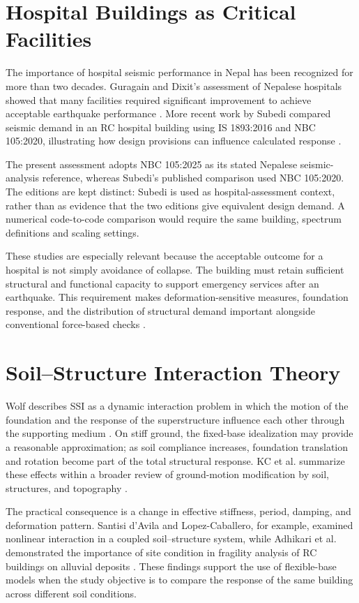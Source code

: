 \section{Hospital Buildings as Critical Facilities}
The importance of hospital seismic performance in Nepal has been recognized for more than two decades. Guragain and Dixit's assessment of Nepalese hospitals showed that many facilities required significant improvement to achieve acceptable earthquake performance \cite{guragain2004}. More recent work by Subedi compared seismic demand in an RC hospital building using IS 1893:2016 and NBC 105:2020, illustrating how design provisions can influence calculated response \cite{subedi2022}.

The present assessment adopts NBC 105:2025 as its stated Nepalese seismic-analysis reference, whereas Subedi's published comparison used NBC 105:2020. The editions are kept distinct: Subedi is used as hospital-assessment context, rather than as evidence that the two editions give equivalent design demand. A numerical code-to-code comparison would require the same building, spectrum definitions and scaling settings.

These studies are especially relevant because the acceptable outcome for a hospital is not simply avoidance of collapse. The building must retain sufficient structural and functional capacity to support emergency services after an earthquake. This requirement makes deformation-sensitive measures, foundation response, and the distribution of structural demand important alongside conventional force-based checks \cite{guragain2004,subedi2022}.

\section{Soil--Structure Interaction Theory}
Wolf describes SSI as a dynamic interaction problem in which the motion of the foundation and the response of the superstructure influence each other through the supporting medium \cite{wolf1985}. On stiff ground, the fixed-base idealization may provide a reasonable approximation; as soil compliance increases, foundation translation and rotation become part of the total structural response. KC et al. summarize these effects within a broader review of ground-motion modification by soil, structures, and topography \cite{kc2025}.

The practical consequence is a change in effective stiffness, period, damping, and deformation pattern. Santisi d'Avila and Lopez-Caballero, for example, examined nonlinear interaction in a coupled soil--structure system, while Adhikari et al. demonstrated the importance of site condition in fragility analysis of RC buildings on alluvial deposits \cite{santisi2016,adhikari2022}. These findings support the use of flexible-base models when the study objective is to compare the response of the same building across different soil conditions.

